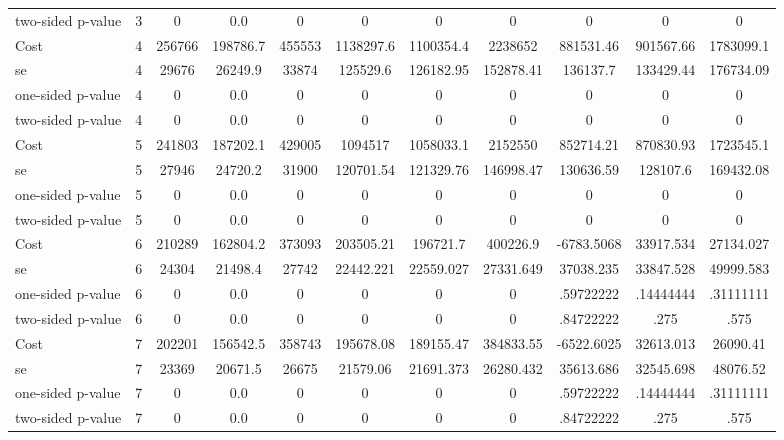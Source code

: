 \begin{tabular}{lcccccccccc}
two-sided p-value &         3 &         0 &       0.0 &         0 & 0 & 0 & 0 & 0 & 0 & 0 \\  
Cost 			  &         4 &    256766 &  198786.7 &    455553 & 1138297.6 & 1100354.4 & 2238652 & 881531.46 & 901567.66 & 1783099.1 \\  
se 				  &         4 &     29676 &   26249.9 &     33874 & 125529.6 & 126182.95 & 152878.41 & 136137.7 & 133429.44 & 176734.09 \\  
one-sided p-value &         4 &         0 &       0.0 &         0 & 0 & 0 & 0 & 0 & 0 & 0 \\  
two-sided p-value &         4 &         0 &       0.0 &         0 & 0 & 0 & 0 & 0 & 0 & 0 \\  
Cost 			  &         5 &    241803 &  187202.1 &    429005 & 1094517 & 1058033.1 & 2152550 & 852714.21 & 870830.93 & 1723545.1 \\  
se 				  &         5 &     27946 &   24720.2 &     31900 & 120701.54 & 121329.76 & 146998.47 & 130636.59 & 128107.6 & 169432.08 \\  
one-sided p-value &         5 &         0 &       0.0 &         0 & 0 & 0 & 0 & 0 & 0 & 0 \\  
two-sided p-value &         5 &         0 &       0.0 &         0 & 0 & 0 & 0 & 0 & 0 & 0 \\  
Cost 			  &         6 &    210289 &  162804.2 &    373093 & 203505.21 & 196721.7 & 400226.9 & -6783.5068 & 33917.534 & 27134.027 \\  
se 				  &         6 &     24304 &   21498.4 &     27742 & 22442.221 & 22559.027 & 27331.649 & 37038.235 & 33847.528 & 49999.583 \\  
one-sided p-value &         6 &         0 &       0.0 &         0 & 0 & 0 & 0 & .59722222 & .14444444 & .31111111 \\  
two-sided p-value &         6 &         0 &       0.0 &         0 & 0 & 0 & 0 & .84722222 & .275 & .575 \\  
Cost 			  &         7 &    202201 &  156542.5 &    358743 & 195678.08 & 189155.47 & 384833.55 & -6522.6025 & 32613.013 & 26090.41 \\  
se 				  &         7 &     23369 &   20671.5 &     26675 & 21579.06 & 21691.373 & 26280.432 & 35613.686 & 32545.698 & 48076.52 \\  
one-sided p-value &         7 &         0 &       0.0 &         0 & 0 & 0 & 0 & .59722222 & .14444444 & .31111111 \\  
two-sided p-value &         7 &         0 &       0.0 &         0 & 0 & 0 & 0 & .84722222 & .275 & .575 \\  

\end{tabular}
